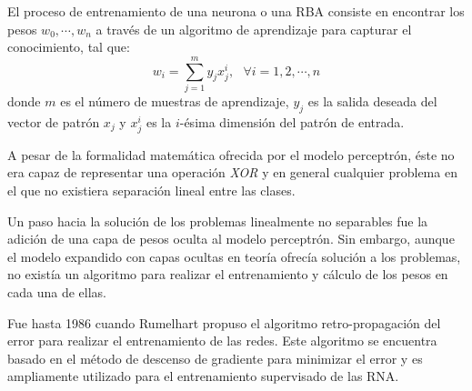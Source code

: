 \documentclass[journal]{IEEEtran}
\begin{document}
El proceso de entrenamiento de una neurona o una RBA consiste en encontrar los pesos $w_0, \cdots, w_n$ a través de un algoritmo de aprendizaje para capturar el conocimiento, tal que:
\begin{equation}
	w_i = \sum_{j=1}^m y_j x_j^i,~~~ \forall i = 1,2,\cdots,n
\end{equation}
donde $m$ es el número de muestras de aprendizaje, $y_j$ es la salida deseada del vector de patrón $x_j$ y $x_j^i$ es la $i$-ésima dimensión del patrón de entrada.

A pesar de la formalidad matemática ofrecida por el modelo perceptrón, éste no era capaz de representar una operación \emph{XOR} y en general cualquier problema en el que no existiera separación lineal entre las clases.

Un paso hacia la solución de los problemas linealmente no separables fue la adición de una capa de pesos oculta al modelo perceptrón.
Sin embargo, aunque el modelo expandido con capas ocultas en teoría ofrecía solución a los problemas, no existía un algoritmo para realizar el entrenamiento y cálculo de los pesos en cada una de ellas.

Fue hasta 1986 cuando Rumelhart propuso el algoritmo retro-propagación del error para realizar el entrenamiento de las redes.
Este algoritmo se encuentra basado en el método de descenso de gradiente para minimizar el error y es ampliamente utilizado para el entrenamiento supervisado de las RNA.
\end{document}
